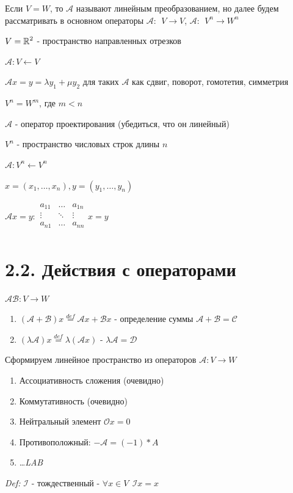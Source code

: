 \documentclass[12pt]{article}
\begin{document}
    \Nota Если $V = W$, то $\mathcal{A}$ называют линейным преобразованием, но далее будем рассматривать в основном операторы $\mathcal{A}: \ \ V \rightarrow V$, $\displaystyle \mathcal{A}: \ \ V^n \rightarrow W^n$



     $\displaystyle V = \mathbb{R}^2$ - пространство направленных отрезков

    $\mathcal{A}: V \leftarrow V$

    $\displaystyle \mathcal{A}x = y = \lambda y_1 + \mu y_2$ для таких $\mathcal{A}$ как сдвиг, поворот, гомотетия, симметрия

     $\displaystyle V^n = W^m$, где $m < n$

    $\mathcal{A}$ - оператор проектирования (убедиться, что он линейный)

     $\displaystyle V^n$ - пространство числовых строк длины $n$

    $\displaystyle \mathcal{A}: V^n \leftarrow V^n$

    $\displaystyle x = (x_1, \dots, x_n), y = (y_1, \dots, y_n)$

    $\displaystyle \mathcal{A}x = y : \begin{array}{|ccc|}
    a_{11} & \ldots & a_{1n}\\
    \vdots & \ddots & \vdots\\
    a_{n1} & \ldots & a_{nn}\\
    \end{array}x = y$


    \section[p2\_2]{2.2. Действия с операторами}

    \Def $\mathcal{A}\mathcal{B}: V \rightarrow W$

    \begin{enumerate}
        \item $(\mathcal{A} + \mathcal{B})x \stackrel{def}{=} \mathcal{A}x + \mathcal{B}x$ - определение суммы $\mathcal{A} + \mathcal{B} = \mathcal{C}$
        \item $(\lambda\mathcal{A})x \stackrel{def}{=} \lambda(\mathcal{A}x)$ - $\lambda\mathcal{A} = \mathcal{D}$
    \end{enumerate}

    \Nota Сформируем линейное пространство из операторов $\mathcal{A}: V \rightarrow W$

    \begin{enumerate}
        \item Ассоциативность сложения (очевидно)
        \item Коммутативность (очевидно)
        \item Нейтральный элемент $\mathcal{O}x = 0$
        \item Противоположный: $-\mathcal{A} = (-1) * A$
        \item \dots \textit{LAB}
    \end{enumerate}

    \textit{Def:} $\mathcal{I}$ - тождественный - $\forall x \in V \ \ \mathcal{I}x = x$
\end{document}
